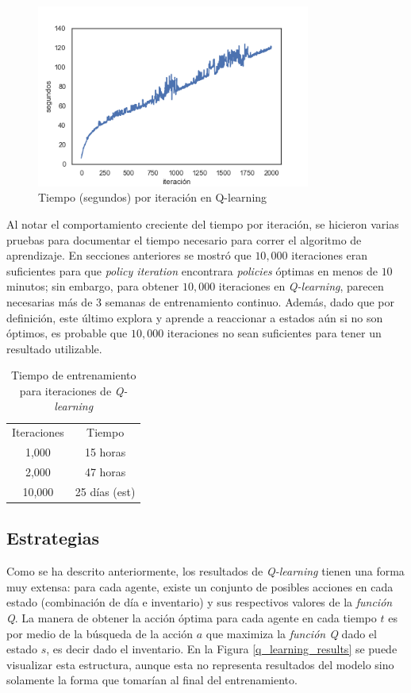 \begin{figure}[H]
\caption{Tiempo (segundos) por iteraci\'on en Q-learning}
\label{q_learning_times}
\includegraphics[width=9cm]{tesis_tex/figs/q_learning_times.png}
\centering
\end{figure}

Al notar el comportamiento creciente del tiempo por iteraci\'on, se hicieron varias pruebas para documentar el tiempo necesario para correr el algoritmo de aprendizaje. En secciones anteriores se mostr\'o que $10,000$ iteraciones eran suficientes para que \textit{policy iteration} encontrara \textit{policies} \'optimas en menos de $10$ minutos; sin embargo, para obtener $10,000$ iteraciones en \textit{Q-learning}, parecen necesarias m\'as de 3 semanas de entrenamiento continuo. Adem\'as, dado que por definici\'on, este \'ultimo explora y aprende a reaccionar a estados a\'un si no son \'optimos, es probable que $10,000$ iteraciones no sean suficientes para tener un resultado utilizable.

\begin{table}
\caption{\label{tab:table-name}Tiempo de entrenamiento para iteraciones de \textit{Q-learning}}
\begin{center}
\begin{tabular}{c|c}
Iteraciones     &  Tiempo\\
1,000     &  15 horas\\
2,000     &  47 horas\\
10,000     & 25 d\'ias (est)
\end{tabular}
\end{center}
\end{table}


\subsection{Estrategias}

Como se ha descrito anteriormente, los resultados de \textit{Q-learning} tienen una forma muy extensa: para cada agente, existe un conjunto de posibles acciones en cada estado (combinaci\'on de d\'ia e inventario) y sus respectivos valores de la \textit{funci\'on Q}. La manera de obtener la acci\'on \'optima para cada agente en cada tiempo $t$ es por medio de la b\'usqueda de la acci\'on $a$ que maximiza la \textit{funci\'on Q} dado el estado $s$, es decir dado el inventario. En la Figura \ref{q_learning_results} se puede visualizar esta estructura, aunque esta no representa resultados del modelo sino solamente la forma que tomar\'ian al final del entrenamiento.\

